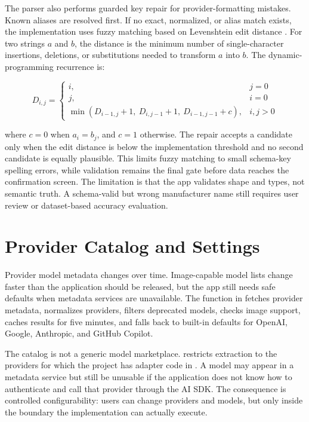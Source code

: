 The parser also performs guarded key repair for provider-formatting mistakes. Known aliases are resolved first. If no exact, normalized, or alias match exists, the implementation uses fuzzy matching based on Levenshtein edit distance \cite{levenshtein1966binary,navarro2001guided}. For two strings \(a\) and \(b\), the distance is the minimum number of single-character insertions, deletions, or substitutions needed to transform \(a\) into \(b\). The dynamic-programming recurrence is:

\[
D_{i,j} =
\begin{cases}
i, & j = 0 \\
j, & i = 0 \\
\min(D_{i-1,j} + 1,\ D_{i,j-1} + 1,\ D_{i-1,j-1} + c), & i,j > 0
\end{cases}
\]

where \(c = 0\) when \(a_i = b_j\), and \(c = 1\) otherwise. The repair accepts a candidate only when the edit distance is below the implementation threshold and no second candidate is equally plausible. This limits fuzzy matching to small schema-key spelling errors, while validation remains the final gate before data reaches the confirmation screen. The limitation is that the app validates shape and types, not semantic truth. A schema-valid but wrong manufacturer name still requires user review or dataset-based accuracy evaluation.

\section{Provider Catalog and Settings}

Provider model metadata changes over time. Image-capable model lists change faster than the application should be released, but the app still needs safe defaults when metadata services are unavailable. The function  in  fetches provider metadata, normalizes providers, filters deprecated models, checks image support, caches results for five minutes, and falls back to built-in defaults for OpenAI, Google, Anthropic, and GitHub Copilot.

The catalog is not a generic model marketplace.  restricts extraction to the providers for which the project has adapter code in . A model may appear in a metadata service but still be unusable if the application does not know how to authenticate and call that provider through the AI SDK. The consequence is controlled configurability: users can change providers and models, but only inside the boundary the implementation can actually execute.

